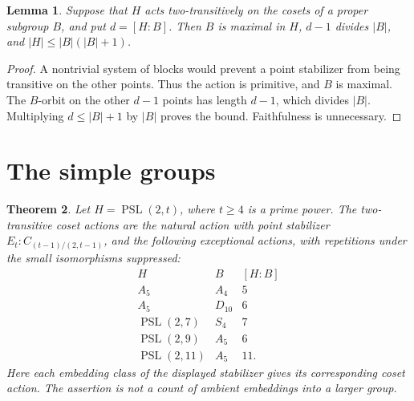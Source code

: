 \documentclass[11pt]{article}
\newtheorem{theorem}{Theorem}
\newtheorem{lemma}[theorem]{Lemma}
\newcommand{\PSL}{\operatorname{PSL}}
\begin{document}
\begin{lemma}\label{bound}
Suppose that $H$ acts two-transitively on the cosets of a proper
subgroup $B$, and put $d=[H:B]$. Then $B$ is maximal in $H$,
$d-1$ divides $|B|$, and $|H|\leq |B|(|B|+1)$.
\end{lemma}
\begin{proof}
A nontrivial system of blocks would prevent a point stabilizer from
being transitive on the other points. Thus the action is primitive,
and $B$ is maximal. The $B$-orbit on the other $d-1$ points has
length $d-1$, which divides $|B|$. Multiplying $d\leq |B|+1$
by $|B|$ proves the bound. Faithfulness is unnecessary.
\end{proof}

\section{The simple groups}
\begin{theorem}\label{simple}
Let $H=\PSL(2,t)$, where $t\geq4$ is a prime power. The
two-transitive coset actions are the natural action with point
stabilizer $E_t:C_{(t-1)/(2,t-1)}$, and the following exceptional
actions, with repetitions under the small isomorphisms suppressed:
\[
\begin{array}{c|c|c}
H&B&[H:B]\\\hline
A_5&A_4&5\\
A_5&D_{10}&6\\
\PSL(2,7)&S_4&7\\
\PSL(2,9)&A_5&6\\
\PSL(2,11)&A_5&11.
\end{array}
\]
Here each embedding class of the displayed stabilizer gives its
corresponding coset action. The assertion is not a count of ambient
embeddings into a larger group.
\end{theorem}
\end{document}
